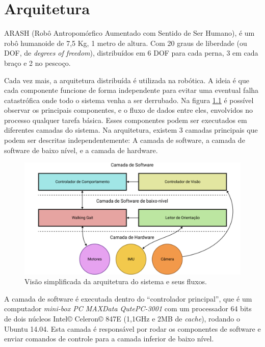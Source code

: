\chapter{Arquitetura}

ARASH (Robô Antropomórfico Aumentado com Sentido de Ser Humano), é um robô humanoide de 7,5 Kg, 1 metro de altura. Com 20 graus de liberdade (ou DOF, de \textit{degrees of freedom}), distribuídos em 6 DOF para cada perna, 3 em cada braço e 2 no pescoço.

Cada vez mais, a arquitetura distribuída é utilizada na robótica. A ideia é que cada componente funcione de forma independente para evitar uma eventual falha catastrófica onde todo o sistema venha a ser derrubado. Na figura \ref{fig:SoftwareArchitecture:Overview} é possível observar os principais componentes, e o fluxo de dados entre eles, envolvidos no processo qualquer tarefa básica. Esses componentes podem ser executados em diferentes camadas do sistema. Na arquitetura, existem 3 camadas principais que podem ser descritas independentemente: A camada de software, a camada de software de baixo nível, e a camada de hardware.

\begin{figure}[htb]
	\centering
	\includegraphics[scale=1]{imagens/svg/softwarearchitecture-flow}
	\caption{Visão simplificada da arquitetura do sistema e seus fluxos.}
	\label{fig:SoftwareArchitecture:Overview}
\end{figure}

A camada de software é executada dentro do ``controlador principal'', que é um computador \textit{mini-box PC MAXData QutePC-3001} com um processador 64 bits de dois núcleos Intel\copyright{} Celeron\copyright{} 847E (1,1GHz e 2MB de \textit{cache}), rodando o Ubuntu 14.04. Esta camada é responsável por rodar os componentes de software e enviar comandos de controle para a camada inferior de baixo nível.

